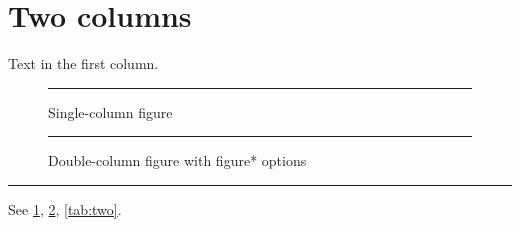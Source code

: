 \documentclass[twocolumn]{article}
\begin{document}
\listoffigures
\section{Two columns}
Text in the first column.
\begin{figure}[tbp]
\centering\rule{2cm}{1cm}
\caption{Single-column figure}\label{fig:one}
\end{figure}
\begin{figure}[tbp]
\centering\rule{8cm}{1cm}
\caption{Double-column figure with figure* options}\label{fig:two}
\end{figure}
\begin{table}[tbp]
\caption{Double-column table}\label{tab:two}
\centering\rule{8cm}{1cm}
\end{table}
See \ref{fig:one}, \ref{fig:two}, \ref{tab:two}.
\end{document}
